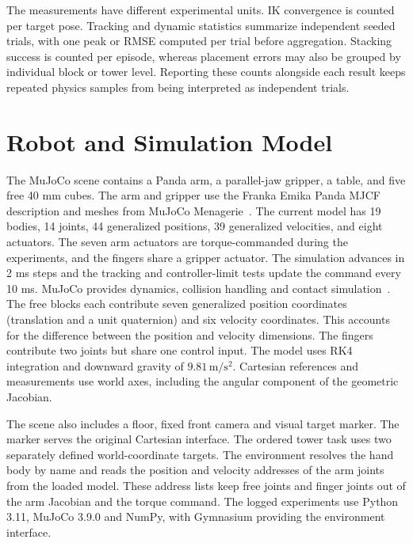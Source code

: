 \documentclass[12pt,a4paper]{article}
\begin{document}
The measurements have different experimental units. IK convergence is counted per target pose. Tracking and dynamic statistics summarize independent seeded trials, with one peak or RMSE computed per trial before aggregation. Stacking success is counted per episode, whereas placement errors may also be grouped by individual block or tower level. Reporting these counts alongside each result keeps repeated physics samples from being interpreted as independent trials.

\section{Robot and Simulation Model}
The MuJoCo scene contains a Panda arm, a parallel-jaw gripper, a table, and five free 40 mm cubes. The arm and gripper use the Franka Emika Panda MJCF description and meshes from MuJoCo Menagerie~\cite{menageriePanda}. The current model has 19 bodies, 14 joints, 44 generalized positions, 39 generalized velocities, and eight actuators. The seven arm actuators are torque-commanded during the experiments, and the fingers share a gripper actuator. The simulation advances in 2 ms steps and the tracking and controller-limit tests update the command every 10 ms. MuJoCo provides dynamics, collision handling and contact simulation~\cite{todorov2012}.
The free blocks each contribute seven generalized position coordinates (translation and a unit quaternion) and six velocity coordinates. This accounts for the difference between the position and velocity dimensions. The fingers contribute two joints but share one control input. The model uses RK4 integration and downward gravity of $9.81\,\mathrm{m/s^2}$. Cartesian references and measurements use world axes, including the angular component of the geometric Jacobian.

The scene also includes a floor, fixed front camera and visual target marker. The marker serves the original Cartesian interface. The ordered tower task uses two separately defined world-coordinate targets. The environment resolves the hand body by name and reads the position and velocity addresses of the arm joints from the loaded model. These address lists keep free joints and finger joints out of the arm Jacobian and the torque command. The logged experiments use Python 3.11, MuJoCo 3.9.0 and NumPy, with Gymnasium providing the environment interface.
\end{document}
